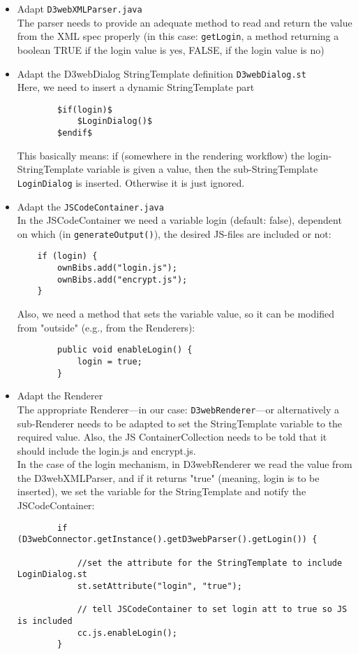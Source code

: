 \documentclass[a4paper,10pt]{scrreprt}
\begin{document}
\begin{itemize}
	\item Adapt \texttt{D3webXMLParser.java}\\
	The parser needs to provide an adequate method to read and return the value from the XML spec properly (in this case: \texttt{getLogin}, a method returning a boolean TRUE if the login value is yes, FALSE, if the login value is no)
	\item Adapt the D3webDialog StringTemplate definition \texttt{D3webDialog.st}\\
	Here, we need to insert a dynamic StringTemplate part
	\begin{verbatim}
		$if(login)$
		    $LoginDialog()$
		$endif$
	\end{verbatim}
	This basically means: if (somewhere in the rendering workflow) the login-StringTemplate variable is given a value, then the sub-StringTemplate \texttt{LoginDialog} is inserted. Otherwise it is just ignored. 
	\item Adapt the \texttt{JSCodeContainer.java}\\
	In the JSCodeContainer we need a variable login (default: false), dependent on which (in \texttt{generateOutput()}), the desired JS-files are included or not:
	\begin{verbatim}
	if (login) {
	    ownBibs.add("login.js");
	    ownBibs.add("encrypt.js");
	}
	\end{verbatim}
	Also, we need a method that sets the variable value, so it can be modified from "outside" (e.g., from the Renderers):
	\begin{verbatim}
		public void enableLogin() {
		    login = true;
		}
	\end{verbatim}
	\item Adapt the Renderer\\
	The appropriate Renderer---in our case: \texttt{D3webRenderer}---or alternatively a sub-Renderer needs to be adapted to set the StringTemplate variable to the required value. Also, the JS ContainerCollection needs to be told that it should include the login.js and encrypt.js.\\
In the case of the login mechanism, in D3webRenderer we read the value from the D3webXMLParser, and if it returns "true" (meaning, login is to be inserted), we set the variable for the StringTemplate and notify the JSCodeContainer: 
	\begin{verbatim}
		if (D3webConnector.getInstance().getD3webParser().getLogin()) {
		    
		    //set the attribute for the StringTemplate to include LoginDialog.st
		    st.setAttribute("login", "true");
		
		    // tell JSCodeContainer to set login att to true so JS is included
		    cc.js.enableLogin();
		}
	\end{verbatim}	
\end{itemize}
\end{document}
